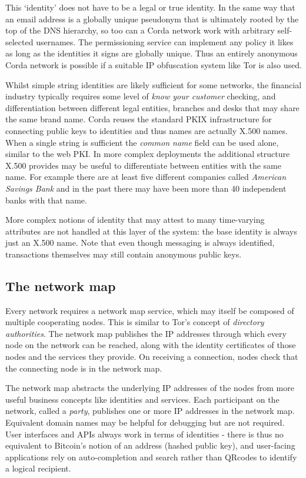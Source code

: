 \documentclass{article}
\begin{document}
This `identity' does not have to be a legal or true identity. In the same way that an email address is a globally
unique pseudonym that is ultimately rooted by the top of the DNS hierarchy, so too can a Corda network work with
arbitrary self-selected usernames. The permissioning service can implement any policy it likes as long as the
identities it signs are globally unique. Thus an entirely anonymous Corda network is possible if a suitable
IP obfuscation system like Tor is also used.

Whilst simple string identities are likely sufficient for some networks, the financial industry typically requires some
level of \emph{know your customer} checking, and differentiation between different legal entities, branches and desks
that may share the same brand name. Corda reuses the standard PKIX infrastructure for connecting public keys to
identities and thus names are actually X.500 names. When a single string is sufficient the \emph{common name} field can
be used alone, similar to the web PKI. In more complex deployments the additional structure X.500 provides may be useful
to differentiate between entities with the same name. For example there are at least five different companies called
\emph{American Savings Bank} and in the past there may have been more than 40 independent banks with that name.

More complex notions of identity that may attest to many time-varying attributes are not handled at this layer of the
system: the base identity is always just an X.500 name. Note that even though messaging is always identified, transactions
themselves may still contain anonymous public keys.

\subsection{The network map}

Every network requires a network map service, which may itself be composed of multiple cooperating nodes. This is
similar to Tor's concept of \emph{directory authorities}. The network map publishes the IP addresses through which
every node on the network can be reached, along with the identity certificates of those nodes and the services they
provide. On receiving a connection, nodes check that the connecting node is in the network map.

The network map abstracts the underlying IP addresses of the nodes from more useful business concepts like identities
and services. Each participant on the network, called a \emph{party}, publishes one or more IP addresses in the
network map. Equivalent domain names may be helpful for debugging but are not required. User interfaces and APIs
always work in terms of identities - there is thus no equivalent to Bitcoin's notion of an address (hashed public key),
and user-facing applications rely on auto-completion and search rather than QRcodes to identify a logical recipient.
\end{document}
